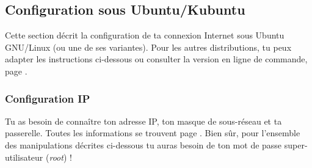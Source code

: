 




\subsection{Configuration sous Ubuntu/Kubuntu}

Cette section décrit la configuration de ta connexion Internet sous Ubuntu GNU/Linux (ou une de ses variantes). Pour les autres distributions, tu peux adapter les instructions ci-dessous ou consulter la version 
en ligne de commande, page \pageref{linux_cmdline}.

\subsubsection{Configuration IP}
Tu as besoin de connaître ton adresse IP, ton masque de sous-réseau et ta  passerelle. Toutes les informations se trouvent page \pageref{calcul_ip}. Bien sûr, pour  l'ensemble des manipulations décrites ci-dessous tu auras besoin de ton  mot de passe super-utilisateur (\emph{root}) !

